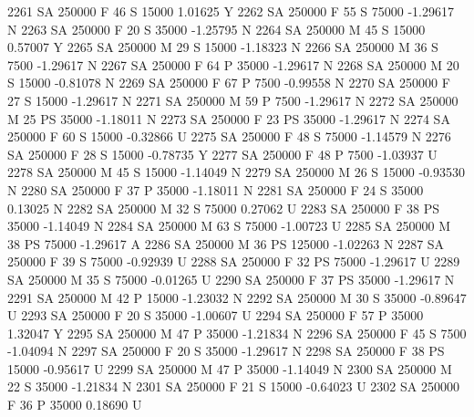 \documentclass{article}
\begin{document}
\begin{Schunk}
\begin{Soutput}
2261     SA     250000   F  46         S  15000   1.01625    Y
2262     SA     250000   F  55         S  75000  -1.29617    N
2263     SA     250000   F  20         S  35000  -1.25795    N
2264     SA     250000   M  45         S  15000   0.57007    Y
2265     SA     250000   M  29         S  15000  -1.18323    N
2266     SA     250000   M  36         S   7500  -1.29617    N
2267     SA     250000   F  64         P  35000  -1.29617    N
2268     SA     250000   M  20         S  15000  -0.81078    N
2269     SA     250000   F  67         P   7500  -0.99558    N
2270     SA     250000   F  27         S  15000  -1.29617    N
2271     SA     250000   M  59         P   7500  -1.29617    N
2272     SA     250000   M  25        PS  35000  -1.18011    N
2273     SA     250000   F  23        PS  35000  -1.29617    N
2274     SA     250000   F  60         S  15000  -0.32866    U
2275     SA     250000   F  48         S  75000  -1.14579    N
2276     SA     250000   F  28         S  15000  -0.78735    Y
2277     SA     250000   F  48         P   7500  -1.03937    U
2278     SA     250000   M  45         S  15000  -1.14049    N
2279     SA     250000   M  26         S  15000  -0.93530    N
2280     SA     250000   F  37         P  35000  -1.18011    N
2281     SA     250000   F  24         S  35000   0.13025    N
2282     SA     250000   M  32         S  75000   0.27062    U
2283     SA     250000   F  38        PS  35000  -1.14049    N
2284     SA     250000   M  63         S  75000  -1.00723    U
2285     SA     250000   M  38        PS  75000  -1.29617    A
2286     SA     250000   M  36        PS 125000  -1.02263    N
2287     SA     250000   F  39         S  75000  -0.92939    U
2288     SA     250000   F  32        PS  75000  -1.29617    U
2289     SA     250000   M  35         S  75000  -0.01265    U
2290     SA     250000   F  37        PS  35000  -1.29617    N
2291     SA     250000   M  42         P  15000  -1.23032    N
2292     SA     250000   M  30         S  35000  -0.89647    U
2293     SA     250000   F  20         S  35000  -1.00607    U
2294     SA     250000   F  57         P  35000   1.32047    Y
2295     SA     250000   M  47         P  35000  -1.21834    N
2296     SA     250000   F  45         S   7500  -1.04094    N
2297     SA     250000   F  20         S  35000  -1.29617    N
2298     SA     250000   F  38        PS  15000  -0.95617    U
2299     SA     250000   M  47         P  35000  -1.14049    N
2300     SA     250000   M  22         S  35000  -1.21834    N
2301     SA     250000   F  21         S  15000  -0.64023    U
2302     SA     250000   F  36         P  35000   0.18690    U

\end{Soutput}
\end{Schunk}
\end{document}
